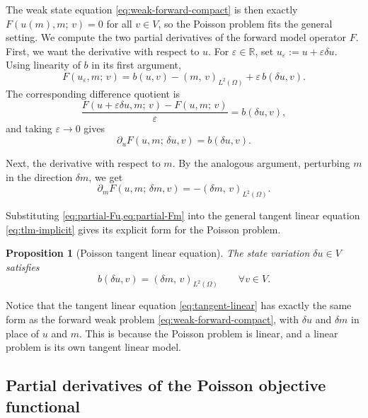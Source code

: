 \documentclass[a4paper,11pt]{article}
\newcommand{\R}{\mathbb{R}}
\newcommand{\Om}{\Omega}
\newcommand{\Lp}[1]{L^{2}(#1)}              %
\newcommand{\inner}[3]{(#1,\,#2)_{#3}}        %
\theoremstyle{spacedplain} \newtheorem{theorem}[counter]{Theorem} \newtheorem{lemma}[counter]{Lemma} \newtheorem{prop}[counter]{Proposition} \newtheorem{cor}[counter]{Corollary}
\theoremstyle{spaceddefinition} \newtheorem{defn}[counter]{Definition} \newtheorem{example}[counter]{Example} \newtheorem{remark}[counter]{Remark}
\begin{document}
The weak state equation \cref{eq:weak-forward-compact} is then exactly $F(u(m), m;\, v) = 0$ for all $v \in V$, so the Poisson problem fits the general setting. We compute the two partial derivatives of the forward model operator $F$. First, we want the derivative with respect to $u$. For $\varepsilon \in \R$, set $u_\varepsilon := u + \varepsilon \delta u$. Using linearity of $b$ in its first argument,
\begin{equation}
  F(u_\varepsilon, m;\, v)
  = b(u, v) - \inner{m}{v}{\Lp{\Om}}
  + \varepsilon\, b(\delta u, v).
\end{equation}
The corresponding difference quotient is
\begin{equation}
  \frac{F(u + \varepsilon \delta u, m;\, v) - F(u, m;\, v)}{\varepsilon}
  = b(\delta u, v),
\end{equation}
and taking $\varepsilon \to 0$ gives
\begin{equation}
  \label{eq:partial-Fu}
  \partial_u F(u, m;\, \delta u, v) = b(\delta u, v).
\end{equation}

Next, the derivative with respect to $m$. By the analogous argument, perturbing $m$ in the direction $\delta m$, we get
\begin{equation}
  \label{eq:partial-Fm}
  \partial_m F(u, m;\, \delta m, v)
  = -\inner{\delta m}{v}{\Lp{\Om}}.
\end{equation}

Substituting \cref{eq:partial-Fu,eq:partial-Fm} into the general tangent linear equation \cref{eq:tlm-implicit} gives its explicit form for the Poisson problem.

\begin{prop}[Poisson tangent linear equation]
\label{prop:tangent-linear} The state variation $\delta u \in V$ satisfies
\begin{equation}
  \label{eq:tangent-linear}
  b(\delta u, v) = \inner{\delta m}{v}{\Lp{\Om}}
  \qquad \forall v \in V.
\end{equation}
\end{prop}

Notice that the tangent linear equation \cref{eq:tangent-linear} has exactly the same form as the forward weak problem \cref{eq:weak-forward-compact}, with $\delta u$ and $\delta m$ in place of $u$ and $m$. This is because the Poisson problem is linear, and a linear problem is its own tangent linear model.

\subsection{Partial derivatives of the Poisson objective functional}
\label{sec:deriv:Jpartial}
\end{document}
